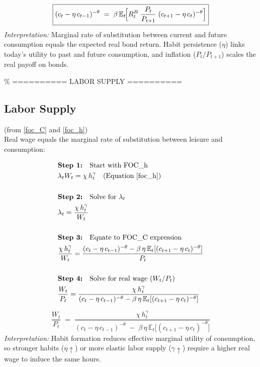 \documentclass[11pt,preprint]{elsarticle}
\numberwithin{equation}{section}
\numberwithin{figure}{section}
\numberwithin{table}{section}
\begin{document}
\[
\boxed{
  (c_t - \eta\,c_{t-1})^{-\theta}
  \;=\;
  \beta\,\mathbb{E}_t\!\Bigl[
    R_t^B \;\frac{P_t}{P_{t+1}}\;(c_{t+1} - \eta\,c_t)^{-\theta}
  \Bigr]
}
\] \textit{Interpretation:} Marginal rate of substitution between
current and future consumption equals the expected real bond return.
Habit persistence (\(\eta\)) links today's utility to past and future
consumption, and inflation (\(P_t/P_{t+1}\)) scales the real payoff on
bonds.

\% ========== LABOR SUPPLY ==========

\subsection*{Labor Supply}

(from \eqref{foc_C} and \eqref{foc_h})\\
Real wage equals the marginal rate of substitution between leisure and
consumption:

\begin{align*}
& \textbf{Step 1:} \quad \text{Start with FOC\_h} \\
& \lambda_t W_t = \chi\,h_t^{\gamma} \quad \text{(Equation \ref{foc_h})} \\
& \\
& \textbf{Step 2:} \quad \text{Solve for } \lambda_t \\
& \lambda_t = \frac{\chi\,h_t^{\gamma}}{W_t} \\
& \\
& \textbf{Step 3:} \quad \text{Equate to FOC\_C expression} \\
& \frac{\chi\,h_t^{\gamma}}{W_t} = \frac{(c_t - \eta\,c_{t-1})^{-\theta} - \beta\,\eta\,\mathbb{E}_t[(c_{t+1} - \eta\,c_t)^{-\theta}]}{P_t} \\
& \\
& \textbf{Step 4:} \quad \text{Solve for real wage } (W_t/P_t) \\
& \frac{W_t}{P_t} = \frac{\chi\,h_t^{\gamma}}{(c_t - \eta\,c_{t-1})^{-\theta} - \beta\,\eta\,\mathbb{E}_t[(c_{t+1} - \eta\,c_t)^{-\theta}]}
\end{align*}

\[
\boxed{
  \frac{W_t}{P_t}
  \;=\;
  \frac{\chi\,h_t^{\gamma}}
       {(c_t - \eta\,c_{t-1})^{-\theta}
        \;-\;
        \beta\,\eta\,\mathbb{E}_t\!\bigl[(c_{t+1} - \eta\,c_t)^{-\theta}\bigr]}
}
\] \textit{Interpretation:} Habit formation reduces effective marginal
utility of consumption, so stronger habits (\(\eta\uparrow\)) or more
elastic labor supply (\(\gamma\uparrow\)) require a higher real wage to
induce the same hours.
\end{document}
